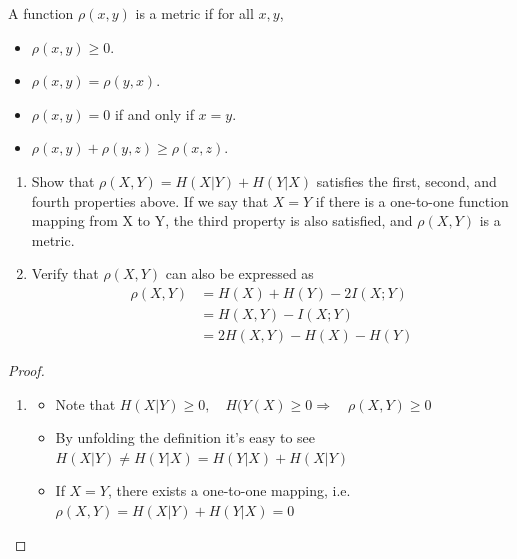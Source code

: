 \begin{exercise}[Metric]{A function $\rho(x, y)$ is a metric if for all $x, y$,
  \begin{itemize}
    \setlength{\itemsep}{2pt}
    \setlength{\parsep}{0pt}
    \setlength{\parskip}{0pt}
    \item $\rho (x,y) \ge 0$.
    \item $\rho (x,y) = \rho (y,x)$.
    \item $\rho(x,y)=0$ if and only if $x=y$.
    \item $\rho(x,y)+\rho(y,z)\ge \rho(x,z)$.
  \end{itemize}
  \begin{enumerate}
    \item Show that $\rho(X, Y) = H(X|Y) + H(Y|X)$ satisfies the first, second, and fourth properties above. If we say that $X = Y$ if there is a one-to-one function mapping from X to Y, the third property is also satisfied, and $\rho(X, Y)$ is a metric.
    \item Verify that $\rho(X, Y)$ can also be expressed as
    \begin{equation}\begin{aligned}
      \rho(X, Y) &=H(X)+H(Y)-2 I(X ; Y) \\
      &=H(X, Y)-I(X ; Y) \\
      &=2 H(X, Y)-H(X)-H(Y)
      \end{aligned}\end{equation}
  \end{enumerate}
}
  \begin{proof}
    \par{~}
    \begin{enumerate}
      \item{
        \begin{itemize}
          \item Note that $H(X | Y) \geqslant 0 , \quad H(Y(X) \geqslant 0  \Rightarrow \quad \rho(X, Y) \geqslant 0$
          \item By unfolding the definition it's easy to see \(H(X | Y) \neq H(Y | X)=H(Y | X)+H(X | Y)\)
          \item If $X=Y$, there exists a one-to-one mapping, i.e. \(\rho(X,Y)= H(X | Y)+H(Y|X)=0\)
          

\end{itemize}}
\end{enumerate}
\end{proof}
\end{exercise}
